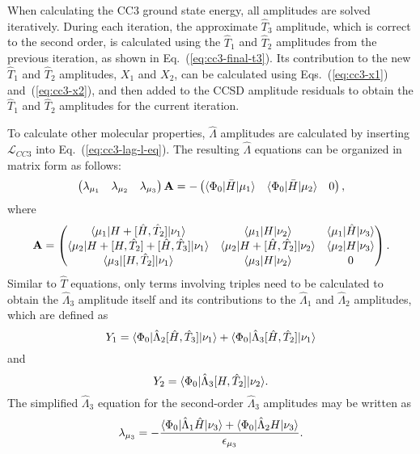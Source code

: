 When calculating the CC3 ground state energy, all amplitudes are solved iteratively. During each iteration, the approximate $\hat{T}_{3}$ amplitude, which is correct to the second order, is calculated using the  $\hat{T}_{1}$ and  $\hat{T}_{2}$ amplitudes from the previous iteration, as shown in Eq.~(\ref{eq:cc3-final-t3}). Its contribution to the new $\hat{T}_{1}$ and  $\hat{T}_{2}$ amplitudes, $X_{1}$ and $X_{2}$, can be calculated using Eqs.~(\ref{eq:cc3-x1}) and~(\ref{eq:cc3-x2}), and then added to the CCSD amplitude residuals to obtain the $\hat{T}_{1}$ and  $\hat{T}_{2}$ amplitudes for the current iteration. 

To calculate other molecular properties, $\hat{\Lambda}$ amplitudes are calculated by inserting $\mathcal{L}_{CC3}$ into Eq.~(\ref{eq:cc3-lag-l-eq}). The resulting $\hat{\Lambda}$ equations can be organized in matrix form as follows:
\begin{gather}
 \begin{pmatrix} \lambda_{\mu_{1}}&\lambda_{\mu_{2}}&\lambda_{\mu_{3}} \end{pmatrix}
 \textbf{A}
 = -
  \begin{pmatrix}
   \langle\Phi_{0} | \bar{H}| \mu_{1} \rangle&
   \langle\Phi_{0} | \bar{H}| \mu_{2} \rangle&
   0
   \end{pmatrix},
\end{gather}
where
\begin{gather}
 \textbf{A} = 
\begin{pmatrix} 
   \langle\mu_{1} |H + [\hat{H}, \hat{T}_{2}]| \nu_{1} \rangle & \langle\mu_{1} |H | \nu_{2} \rangle & \langle\mu_{1} |\hat{H} | \nu_{3} \rangle \\
   \langle\mu_{2} |H + [H, \hat{T}_{2}]+ [\hat{H}, \hat{T}_{3}]| \nu_{1} \rangle & \langle\mu_{2} |H + [\hat{H}, \hat{T}_{2}]| \nu_{2} \rangle &  \langle\mu_{2} | H | \nu_{3} \rangle  \\
    \langle\mu_{3} | [H, \hat{T}_{2}]| \nu_{1} \rangle &  \langle\mu_{3} | H | \nu_{2} \rangle & 0
  \end{pmatrix}.
\end{gather}
Similar to $\hat{T}$ equations, only terms involving triples need to be calculated to obtain the $\hat{\Lambda}_{3}$ amplitude itself and its contributions to the $\hat{\Lambda}_{1}$ and $\hat{\Lambda}_{2}$ amplitudes, which are defined as
\begin{equation}
Y_{1} = \langle\Phi_{0} |\hat{\Lambda}_{2}[\hat{H}, \hat{T}_{3}]| \nu_{1} \rangle + \langle\Phi_{0} |\hat{\Lambda}_{3}[\hat{H}, \hat{T}_{2}]| \nu_{1} \rangle
\label{eq:cc3-y1}
\end{equation}
and
\begin{equation}
Y_{2} = \langle\Phi_{0} |\hat{\Lambda}_{3}[H, \hat{T}_{2}]| \nu_{2} \rangle.
\label{eq:cc3-y2}
\end{equation}
The simplified $\hat{\Lambda}_{3}$ equation for the second-order $\hat{\Lambda}_{3}$ amplitudes may be written as
\begin{equation}
\lambda_{\mu_{3}}=-\frac{\langle\Phi_{0} |\hat{\Lambda}_{1}\hat{H}| \nu_{3} \rangle + \langle\Phi_{0} |\hat{\Lambda}_{2}H| \nu_{3} \rangle}{\epsilon_{\mu_{3}}}.
\label{eq:cc3-l3}
\end{equation}

